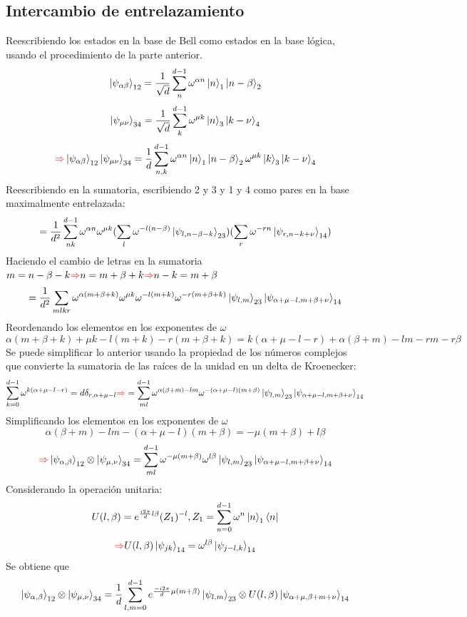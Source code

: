 \documentclass{book}
\begin{document}
\subsection{Intercambio de entrelazamiento} Reescribiendo los estados en la base de Bell como estados en la base lógica, usando el procedimiento de la parte anterior.  
$$\ket{\psi_{\alpha \beta}}_{12}=\frac{1}{\sqrt{d}}\sum_n^{d-1} \omega^{\alpha n}\ket{n}_1\ket{n-\beta}_2$$
$$\ket{\psi_{\mu\nu}}_{34}=\frac{1}{\sqrt{d}}\sum_k^{d-1} \omega^{\mu k}\ket{n}_3\ket{k-\nu}_4$$
$$\textcolor{red}{\Rightarrow} \ket{\psi_{\alpha \beta}}_{12}\ket{\psi_{\mu\nu}}_{34}=\frac{1}{d}\sum_{n,k}^{d-1} \omega^{\alpha n}\ket{n}_1\ket{n-\beta}_2 \omega^{\mu k}\ket{k}_3\ket{k-\nu}_4$$
Reescribiendo en la sumatoria, escribiendo 2 y 3 y 1 y 4 como pares en la base maximalmente entrelazada: $$=\frac{1}{d^2}\sum_{nk}^{d-1}\omega^{\alpha n}\omega^{\mu k}(\sum_{l}\omega^{-l(n-\beta)}\ket{\psi_{l,n-\beta-k}}_{23})(\sum_{r}\omega^{-rn}\ket{\psi_{r,n-k+\nu}}_{14})$$
Haciendo el cambio de letras en la sumatoria $m=n-\beta-k\textcolor{red}{\Rightarrow} n=m+\beta+k \textcolor{red}{\Rightarrow} n-k=m+\beta$
$$=\frac{1}{d^2}\sum_{mlkr}\omega^{\alpha (m+\beta+k)}\omega^{\mu k}\omega^{-l(m+k)}\omega^{-r(m+\beta+k)}\ket{\psi_{l,m}}_{23}\ket{\psi_{\alpha+\mu-l,m+\beta+\nu}}_{14}$$
Reordenando los elementos en los exponentes de $\omega$ $$ \alpha(m+\beta+k)+\mu k-l(m+k)-r(m+\beta+k)=k(\alpha+\mu-l-r)+\alpha(\beta+m)-lm-rm-r\beta$$
Se puede simplificar lo anterior usando la propiedad de los números complejos que convierte la sumatoria de las raíces de la unidad en un delta de Kroenecker:
$$\sum_{k=0}^{d-1}\omega^{k(\alpha+\mu-l-r)}=d\delta_{r,\alpha+\mu-l}\textcolor{red}{\Rightarrow} =\sum_{ml}^{d-1} \omega^{\alpha(\beta+m)-lm}\omega^{-(\alpha+\mu-l)(m+\beta)}\ket{\psi_{l,m}}_{23}\ket{\psi_{\alpha+\mu-l,m+\beta+\nu}}_{14} $$
Simplificando los elementos en los exponentes de $\omega$
$$\alpha(\beta+m)-lm-(\alpha+\mu-l)(m+\beta)=-\mu(m+\beta)+l\beta$$
$$\textcolor{red}{\Rightarrow} \ket{\psi_{\alpha,\beta}}_{12}\otimes\ket{\psi_{\mu,\nu}}_{34} =\sum_{ml}^{d-1} \omega^{-\mu(m+\beta)}\omega^{l\beta}\ket{\psi_{l,m}}_{23}\ket{\psi_{\alpha+\mu-l,m+\beta+\nu}}_{14}$$
Considerando la operación unitaria:
$$ U(l,\beta)=e^{\frac{i2\pi}{d}l\beta}(Z_1)^{-l}, Z_1=\sum_{n=0}^{d-1}\omega^n\ket{n}_1\bra{n}$$
$$\textcolor{red}{\Rightarrow} U(l,\beta)\ket{\psi_{jk}}_{14}=\omega^{l\beta}\ket{\psi_{j-l,k}}_{14}$$
Se obtiene que 
$$\ket{\psi_{\alpha,\beta}}_{12}\otimes\ket{\psi_{\mu,\nu}}_{34}=\frac{1}{d}\sum_{l,m=0}^{d-1}e^{\frac{-i2\pi }{d}\mu(m+\beta)}\ket{\psi_{l,m}}_{23}\otimes U(l,\beta)\ket{\psi_{\alpha+\mu,\beta+m+\nu}}_{14}$$
\end{document}
